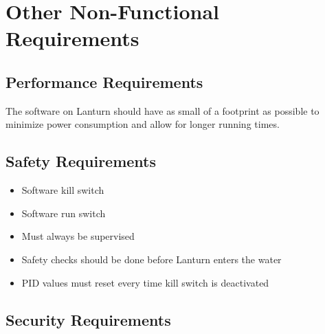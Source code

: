 \section{Other Non-Functional Requirements}
\label{sec:non-functional}

\subsection{Performance Requirements}
\label{sec:performance}

The software on Lanturn should have as small of a footprint as possible to
minimize power consumption and allow for longer running times.
\par

\subsection{Safety Requirements}
\label{sec:safety}

\begin{itemize}
    \item Software kill switch 
    \item Software run switch 
    \item Must always be supervised 
    \item Safety checks should be done before Lanturn enters the water 
    \item PID values must reset every time kill switch is deactivated
\end{itemize}

\subsection{Security Requirements}
\label{sec:security}

